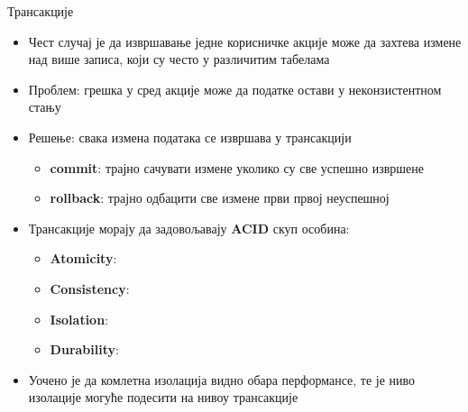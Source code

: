 \documentclass{beamer}
\begin{document}
    \begin{frame}[allowframebreaks]{Трансакције}
        \begin{itemize}
            \item Чест случај је да извршавање једне корисничке акције може да захтева измене над више записа, који су често у различитим табелама
            \item Проблем: грешка у сред акције може да податке остави у неконзистентном стању
            \item Решење: свака измена података се извршава у трансакцији
            \begin{itemize}
                \item \textbf{commit}: трајно сачувати измене уколико су све успешно извршене
                \item \textbf{rollback}: трајно одбацити све измене први првој неуспешној 
            \end{itemize}
        \end{itemize}
        
        \framebreak
        
        \begin{itemize}
            \item Трансакције морају да задовољавају \textbf{ACID} скуп особина:
            \begin{itemize}
                \item \textbf{Atomicity}:
                \item \textbf{Consistency}:
                \item \textbf{Isolation}:
                \item \textbf{Durability}:
            \end{itemize}
            \item Уочено је да комлетна изолација видно обара перформансе, те је ниво изолације могуће подесити на нивоу трансакције
        \end{itemize}
        
        \framebreak
        

\end{frame}
\end{document}
